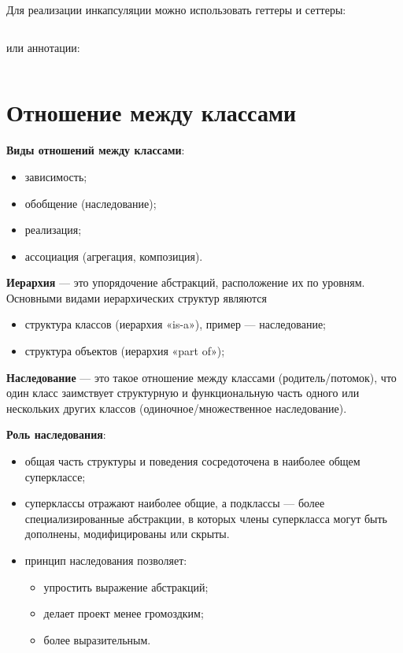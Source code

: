 \documentclass[a4paper,12pt,oneside]{extbook}
\begin{document}
Для реализации инкапсуляции можно использовать геттеры и сеттеры:
\inputminted{python}{./examples/get_and_set.py}
или аннотации:
\inputminted{python}{./examples/annotations.py}

\section{Отношение между классами}%
\label{sec:Отношение между классами}

\textbf{Виды отношений между классами}:
\begin{itemize}
    \item зависимость;
    \item обобщение (наследование);
    \item реализация;
    \item ассоциация (агрегация, композиция).
\end{itemize}

\textbf{Иерархия} — это упорядочение абстракций, расположение их по уровням. Основными видами иерархических структур являются
\begin{itemize}
    \item структура классов (иерархия «is-a»), пример — наследование;
    \item структура объектов (иерархия «part of»);
\end{itemize}

\textbf{Наследование} — это такое отношение между классами (родитель/потомок), что один класс заимствует структурную и функциональную часть одного или нескольких других классов (одиночное/множественное наследование).

\textbf{Роль наследования}:
\begin{itemize}
    \item общая часть структуры и поведения сосредоточена в наиболее общем суперклассе;
    \item суперклассы отражают наиболее общие, а подклассы — более специализированные абстракции, в которых члены суперкласса могут быть дополнены, модифицированы или скрыты.
    \item принцип наследования позволяет:
          \begin{itemize}
              \item упростить выражение абстракций;
              \item делает проект менее громоздким;
              \item более выразительным.
          \end{itemize}
\end{itemize}
\end{document}
